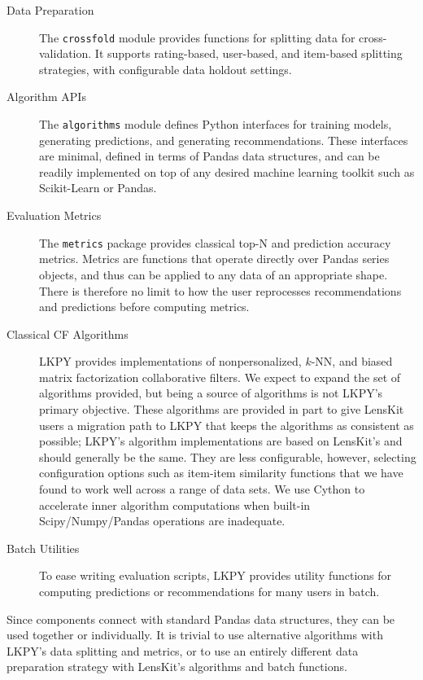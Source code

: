 \begin{description}
\item[Data Preparation]
The \texttt{crossfold} module provides functions for splitting data for cross-validation.
It supports rating-based, user-based, and item-based splitting strategies, with configurable data holdout settings.

\item[Algorithm APIs]
The \texttt{algorithms} module defines Python interfaces for training models, generating predictions, and generating recommendations.
These interfaces are minimal, defined in terms of Pandas data structures, and can be readily implemented on top of any desired machine learning toolkit such as Scikit-Learn or Pandas.

\item[Evaluation Metrics]
The \texttt{metrics} package provides classical top-N and prediction accuracy metrics.
Metrics are functions that operate directly over Pandas series objects, and thus can be applied to any data of an appropriate shape.
There is therefore no limit to how the user reprocesses recommendations and predictions before computing metrics.

\item[Classical CF Algorithms]
LKPY provides implementations of nonpersonalized, $k$-NN, and biased matrix factorization collaborative filters.
We expect to expand the set of algorithms provided, but being a source of algorithms is not LKPY's primary objective.
These algorithms are provided in part to give LensKit users a migration path to LKPY that keeps the algorithms as consistent as possible; LKPY's algorithm implementations are based on LensKit's and should generally be the same.
They are less configurable, however, selecting configuration options such as item-item similarity functions that we have found to work well across a range of data sets.
We use Cython to accelerate inner algorithm computations when built-in Scipy/Numpy/Pandas operations are inadequate.

\item[Batch Utilities]
To ease writing evaluation scripts, LKPY provides utility functions for computing predictions or recommendations for many users in batch.
\end{description}

Since components connect with standard Pandas data structures, they can be used together or individually.
It is trivial to use alternative algorithms with LKPY's data splitting and metrics, or to use an entirely different data preparation strategy with LensKit's algorithms and batch functions.

